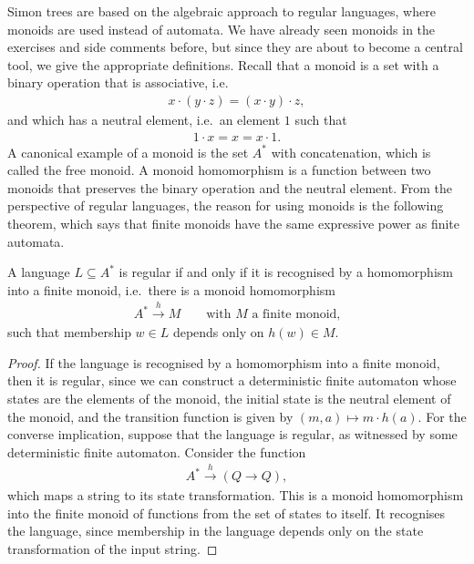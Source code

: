 Simon trees are based on the algebraic approach to regular languages, where monoids are used instead of automata.  
We have already seen monoids in the exercises and side comments before, but since they are about to  become a central tool,  we give the appropriate definitions.  Recall that a monoid is a set with a binary operation that is associative, i.e.~
\begin{align*}
x \cdot (y \cdot z) = (x \cdot y) \cdot z,
\end{align*}
and which has a neutral element, i.e.~an element $1$ such that 
\begin{align*}
1 \cdot x = x = x \cdot 1.
\end{align*}
A canonical example of a monoid is the set $A^*$ with concatenation, which is called the free monoid. A monoid homomorphism is a function between two monoids that preserves the binary operation and the neutral element. From the perspective of regular languages, the reason for using monoids is the following theorem, which says that finite monoids have the same expressive power as finite automata.
\begin{theorem}\label{thm:monoids-equal-automata}
A language $L \subseteq A^*$ is regular if and only if it is recognised by a homomorphism into a finite monoid, i.e.~there  is a monoid homomorphism
\begin{align*}
A^* \xrightarrow h M \qquad \text{with $M$ a finite monoid,}
\end{align*}
such that membership $w \in L$ depends only on $h(w) \in M$.
\end{theorem}
\begin{proof}
    If the language is recognised by a homomorphism into a finite monoid, then it is regular, since we can construct a deterministic finite automaton whose states are the elements of the monoid, the initial state is the neutral element of the monoid, and the transition function is given by $(m,a) \mapsto m \cdot h(a)$. For the converse implication, suppose that the language is regular, as witnessed by some deterministic finite automaton. Consider the function 
    \begin{align*}
    A^* \xrightarrow h (Q \to Q),
    \end{align*}
    which maps a string to its state transformation. This is a monoid homomorphism into the finite monoid of functions from the set of states to itself. It recognises the language, since membership in the language depends only on the state transformation of the input string.
\end{proof}

